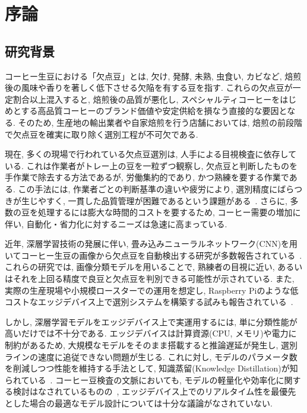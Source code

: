 \chapter{序論} \label{chap:jyoron}

\section{研究背景}%
コーヒー生豆における「欠点豆」とは, 欠け, 発酵, 未熟, 虫食い, カビなど, 焙煎後の風味や香りを著しく低下させる欠陥を有する豆を指す. 
これらの欠点豆が一定割合以上混入すると, 焙煎後の品質が悪化し, スペシャルティコーヒーをはじめとする高品質コーヒーのブランド価値や安定供給を損なう直接的な要因となる. 
そのため, 生産地の輸出業者や自家焙煎を行う店舗においては, 焙煎の前段階で欠点豆を確実に取り除く選別工程が不可欠である.

現在, 多くの現場で行われている欠点豆選別は, 人手による目視検査に依存している. 
これは作業者がトレー上の豆を一粒ずつ観察し, 欠点豆と判断したものを手作業で除去する方法であるが, 労働集約的であり, かつ熟練を要する作業である. 
この手法には, 作業者ごとの判断基準の違いや疲労により, 選別精度にばらつきが生じやすく, 一貫した品質管理が困難であるという課題がある~\cite{pinto2017classification}. 
さらに, 多数の豆を処理するには膨大な時間的コストを要するため, コーヒー需要の増加に伴い, 自動化・省力化に対するニーズは急速に高まっている.

近年, 深層学習技術の発展に伴い, 畳み込みニューラルネットワーク(CNN)を用いてコーヒー生豆の画像から欠点豆を自動検出する研究が多数報告されている~\cite{pinto2017classification, huang2020smart, wang2021deep}. 
これらの研究では, 画像分類モデルを用いることで, 熟練者の目視に近い, あるいはそれを上回る精度で良豆と欠点豆を判別できる可能性が示されている. 
また, 実際の生産現場や小規模ロースターでの運用を想定し, Raspberry Piのような低コストなエッジデバイス上で選別システムを構築する試みも報告されている~\cite{fukai2018classification}.

しかし, 深層学習モデルをエッジデバイス上で実運用するには, 単に分類性能が高いだけでは不十分である. 
エッジデバイスは計算資源(CPU, メモリ)や電力に制約があるため, 大規模なモデルをそのまま搭載すると推論遅延が発生し, 選別ラインの速度に追従できない問題が生じる. 
これに対し, モデルのパラメータ数を削減しつつ性能を維持する手法として, 知識蒸留(Knowledge Distillation)が知られている~\cite{hinton2015distilling}. 
コーヒー豆検査の文脈においても, モデルの軽量化や効率化に関する検討はなされているものの~\cite{wang2021deep}, エッジデバイス上でのリアルタイム性を最優先とした場合の最適なモデル設計については十分な議論がなされていない.

